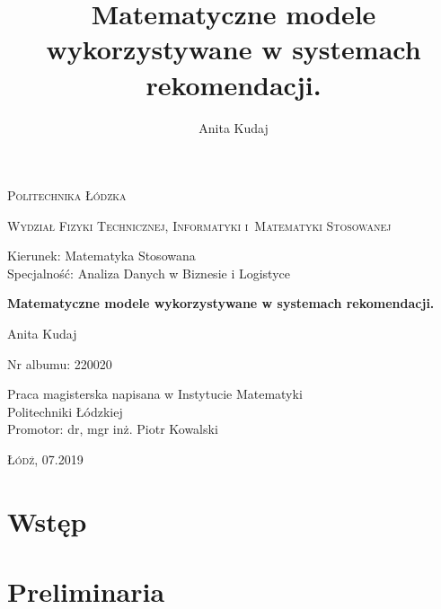 \documentclass[12pt,a4paper]{report}
\author{Anita Kudaj}
\title{Matematyczne modele wykorzystywane w systemach rekomendacji.}
\begin{document}
\begin{titlepage}
\begin{flushleft}
\end{flushleft}
\begin{center}
\textsc{{\huge Politechnika Łódzka}}
\end{center}
\bigskip
\bigskip
\begin{center}
\textsc{{\Large Wydział Fizyki Technicznej, Informatyki i~Matematyki Stosowanej}}
\end{center}
\bigskip
\bigskip
\begin{Large}
Kierunek: Matematyka Stosowana
\\Specjalność: Analiza Danych w Biznesie i Logistyce

\end{Large}
\bigskip
\bigskip
\noindent\hrulefill
\begin{center}
{\textbf{{\Large Matematyczne modele wykorzystywane w systemach rekomendacji.}}}
\end{center}
\begin{flushright}
{\large 
Anita Kudaj

Nr albumu: 
220020
}
\end{flushright}
\noindent\hrulefill
\bigskip
\bigskip
\begin{center}
{\large Praca magisterska
napisana w Instytucie Matematyki 
\\Politechniki Łódzkiej 
\bigskip
\bigskip
\\Promotor: dr, mgr inż. Piotr Kowalski
 }
\end{center}
\bigskip
\bigskip
\bigskip
\bigskip
\begin{center}
{\textsc{\large Łódź, 07.2019}}
\end{center}
\end{titlepage}


\tableofcontents


\chapter{Wstęp}
\chapter{Preliminaria} %
\end{document}
